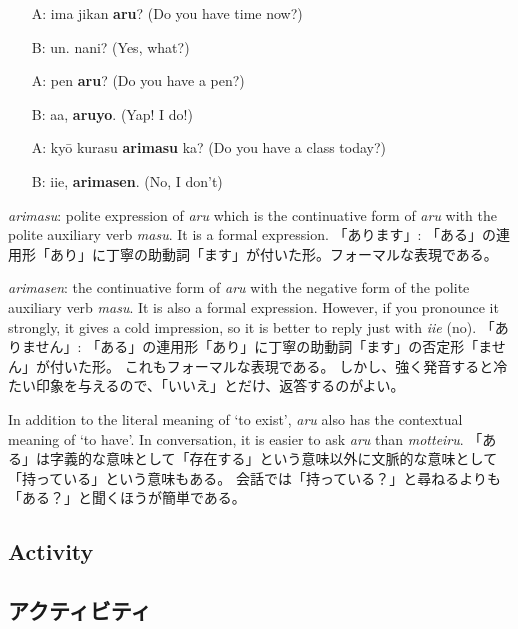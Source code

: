 \documentclass[uplatex,dvipdfmx,b5paper,english,10pt]{jsbook}
\begin{document}
\begin{itemize}
 \item[A:] ima jikan {\bfseries aru}? (Do you have time now?)
 \item[B:] un. nani? (Yes, what?)
 \item[A:] pen {\bfseries aru}? (Do you have a pen?)
 \item[B:] aa, {\bfseries aruyo}. (Yap! I do!)
 \item[A:] ky\=o kurasu {\bfseries arimasu} ka? (Do you have a class today?)
 \item[B:] iie, {\bfseries arimasen}. (No, I don't)
\end{itemize}

\begin{note}
\ifEnglish
{\it arimasu\/}: polite expression of {\it aru\/} which is the continuative form of {\it aru\/} with the polite auxiliary verb {\it masu\/}. It is a formal expression.
\else
「あります」: 「ある」の連用形「あり」に丁寧の助動詞「ます」が付いた形。フォーマルな表現である。
\fi
\end{note}
\begin{note}
\ifEnglish
{\it arimasen\/}: the continuative form of {\it aru\/} with the negative form of the polite auxiliary verb {\it masu\/}. It is also a formal expression.
However, if you pronounce it strongly, it gives a cold impression, so it is better to reply just with {\it iie\/} (no).
\else
「ありません」: 「ある」の連用形「あり」に丁寧の助動詞「ます」の否定形「ません」が付いた形。
これもフォーマルな表現である。
しかし、強く発音すると冷たい印象を与えるので、「いいえ」とだけ、返答するのがよい。
\fi
\end{note}

\begin{toianswer}
\ifEnglish
In addition to the literal meaning of `to exist', {\it aru\/} also has the contextual meaning of `to have'.
In conversation, it is easier to ask {\it aru\/} than {\it motteiru\/}.
\else
「ある」は字義的な意味として「存在する」という意味以外に文脈的な意味として「持っている」という意味もある。
会話では「持っている？」と尋ねるよりも「ある？」と聞くほうが簡単である。
\fi%
\end{toianswer}

\ifEnglish
\subsection{Activity}
\else
\subsection{アクティビティ}
\fi
\end{document}
